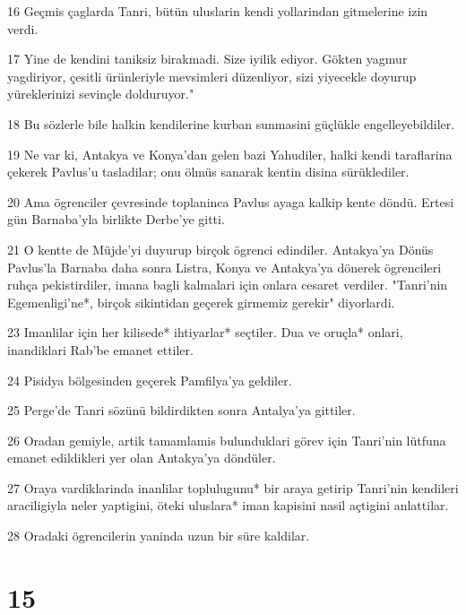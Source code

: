 \par 16 Geçmis çaglarda Tanri, bütün uluslarin kendi yollarindan gitmelerine izin verdi.
\par 17 Yine de kendini taniksiz birakmadi. Size iyilik ediyor. Gökten yagmur yagdiriyor, çesitli ürünleriyle mevsimleri düzenliyor, sizi yiyecekle doyurup yüreklerinizi sevinçle dolduruyor."
\par 18 Bu sözlerle bile halkin kendilerine kurban sunmasini güçlükle engelleyebildiler.
\par 19 Ne var ki, Antakya ve Konya'dan gelen bazi Yahudiler, halki kendi taraflarina çekerek Pavlus'u tasladilar; onu ölmüs sanarak kentin disina sürüklediler.
\par 20 Ama ögrenciler çevresinde toplaninca Pavlus ayaga kalkip kente döndü. Ertesi gün Barnaba'yla birlikte Derbe'ye gitti.
\par 21 O kentte de Müjde'yi duyurup birçok ögrenci edindiler. Antakya'ya Dönüs Pavlus'la Barnaba daha sonra Listra, Konya ve Antakya'ya dönerek ögrencileri ruhça pekistirdiler, imana bagli kalmalari için onlara cesaret verdiler. "Tanri'nin Egemenligi'ne*, birçok sikintidan geçerek girmemiz gerekir" diyorlardi.
\par 23 Imanlilar için her kilisede* ihtiyarlar* seçtiler. Dua ve oruçla* onlari, inandiklari Rab'be emanet ettiler.
\par 24 Pisidya bölgesinden geçerek Pamfilya'ya geldiler.
\par 25 Perge'de Tanri sözünü bildirdikten sonra Antalya'ya gittiler.
\par 26 Oradan gemiyle, artik tamamlamis bulunduklari görev için Tanri'nin lütfuna emanet edildikleri yer olan Antakya'ya döndüler.
\par 27 Oraya vardiklarinda inanlilar toplulugunu* bir araya getirip Tanri'nin kendileri araciligiyla neler yaptigini, öteki uluslara* iman kapisini nasil açtigini anlattilar.
\par 28 Oradaki ögrencilerin yaninda uzun bir süre kaldilar.

\chapter{15}

